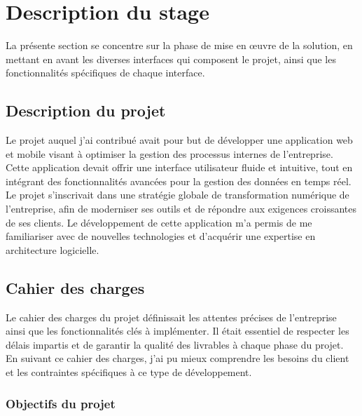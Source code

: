 \chapter{Description du stage}
\renewcommand{\thesubsection}{\arabic{subsection}} %
\label{part:Réaslisation-de-projet}
La présente section se concentre sur la phase de mise en œuvre de la solution, en mettant en avant les diverses interfaces qui composent le projet, ainsi que les fonctionnalités spécifiques de chaque interface.\\

\section{Description du projet}

Le projet auquel j'ai contribué avait pour but de développer une application web et mobile visant à optimiser la gestion des processus internes de l'entreprise. Cette application devait offrir une interface utilisateur fluide et intuitive, tout en intégrant des fonctionnalités avancées pour la gestion des données en temps réel. Le projet s'inscrivait dans une stratégie globale de transformation numérique de l'entreprise, afin de moderniser ses outils et de répondre aux exigences croissantes de ses clients. Le développement de cette application m'a permis de me familiariser avec de nouvelles technologies et d'acquérir une expertise en architecture logicielle.

\section{Cahier des charges}

Le cahier des charges du projet définissait les attentes précises de l'entreprise ainsi que les fonctionnalités clés à implémenter. Il était essentiel de respecter les délais impartis et de garantir la qualité des livrables à chaque phase du projet. En suivant ce cahier des charges, j'ai pu mieux comprendre les besoins du client et les contraintes spécifiques à ce type de développement.

\subsection{Objectifs du projet}

